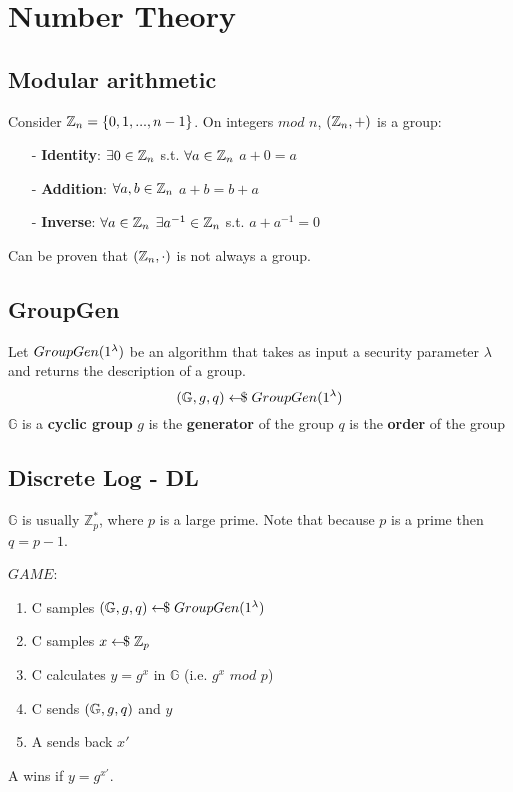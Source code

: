 \chapter{Number Theory}

\section{Modular arithmetic}
Consider $\mathbb{Z}_n = \{ 0,1, ..., n-1 \}$.\newline
On integers $mod$ $n$, $(\mathbb{Z}_n,+)$ is a group:
\begin{itemize}
    \item[-] \textbf{Identity}: $\exists 0 \in \mathbb{Z}_n$ s.t. $\forall a \in \mathbb{Z}_n$ $a + 0 = a$ \modn
    \item[-] \textbf{Addition}: $\forall a,b \in \mathbb{Z}_n$ $a+b = b+a$ \modn
    \item[-] \textbf{Inverse}: $\forall a \in \mathbb{Z}_n$ $\exists a^{-1} \in \mathbb{Z}_n$ s.t. $a + a^{-1} = 0$  
\end{itemize}

Can be proven that $(\mathbb{Z}_n,\cdot)$ is not always a group.


\section{GroupGen}
Let $GroupGen(1^\lambda)$ be an algorithm that takes as input a security parameter $\lambda$ and returns the description of a group.
\[ (\mathbb{G},g,q) \leftarrow\kern-0.42em{\$} \; GroupGen(1^\lambda) \]
$\mathbb{G}$ is a \textbf{cyclic group}\newline
$g$ is the \textbf{generator} of the group\newline
$q$ is the \textbf{order} of the group


\section{Discrete Log - DL}
$\mathbb{G}$ is usually $\mathbb{Z}_p^*$, where $p$ is a large prime.\newline
Note that because $p$ is a prime then $q = p-1$.

$GAME$:
\begin{enumerate}
    \item C samples $(\mathbb{G},g,q) \leftarrow\kern-0.42em{\$} \; GroupGen(1^\lambda)$
    \item C samples $x \leftarrow\kern-0.42em{\$} \; \mathbb{Z}_p$ 
    \item C calculates $y = g^x$ in $\mathbb{G}$ (i.e. $g^x$ $mod$ $p$)
    \item C sends $(\mathbb{G},g,q)$ and $y$
    \item A sends back $x'$
\end{enumerate}
A wins if $y = g^{x'}$.

